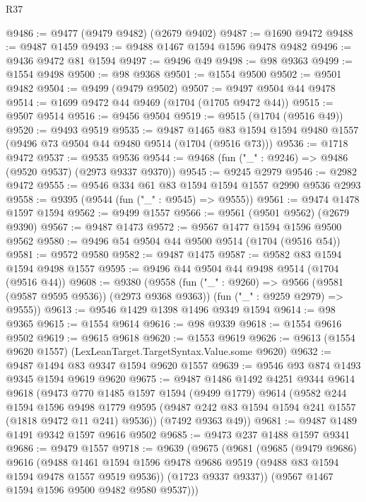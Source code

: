 \begin{lexlean}{R37}
\begin{coremodule}
@9486 := @9477 (@9479 @9482) (@2679 @9402)
@9487 := @1690 @9472
@9488 := @9487 @1459
@9493 := @9488 @1467 @1594 @1596 @9478 @9482
@9496 := @9436 @9472 @81 @1594
@9497 := @9496 @49
@9498 := @98 @9363
@9499 := @1554 @9498
@9500 := @98 @9368
@9501 := @1554 @9500
@9502 := @9501 @9482
@9504 := @9499 (@9479 @9502)
@9507 := @9497 @9504 @44 @9478
@9514 := @1699 @9472 @44 @9469 (@1704 (@1705 @9472 @44))
@9515 := @9507 @9514
@9516 := @9456 @9504
@9519 := @9515 (@1704 (@9516 @49))
@9520 := @9493 @9519
@9535 := @9487
    @1465
    @83
    @1594
    @1594
    @9480
    @1557
    (@9496 @73 @9504 @44 @9480 @9514 (@1704 (@9516 @73)))
@9536 := @1718 @9472
@9537 := @9535 @9536
@9544 := @9468 (fun ("_" : @9246) => @9486 (@9520 @9537) (@2973 @9337 @9370))
@9545 := @9245 @2979
@9546 := @2982 @9472
@9555 := @9546 @334 @61 @83 @1594 @1594 @1557 @2990 @9536 @2993
@9558 := @9395 (@9544 (fun ("_" : @9545) => @9555))
@9561 := @9474 @1478 @1597 @1594
@9562 := @9499 @1557
@9566 := @9561 (@9501 @9562) (@2679 @9390)
@9567 := @9487 @1473
@9572 := @9567 @1477 @1594 @1596 @9500 @9562
@9580 := @9496 @54 @9504 @44 @9500 @9514 (@1704 (@9516 @54))
@9581 := @9572 @9580
@9582 := @9487 @1475
@9587 := @9582 @83 @1594 @1594 @9498 @1557
@9595 := @9496 @44 @9504 @44 @9498 @9514 (@1704 (@9516 @44))
@9608 := @9380
    (@9558
      (fun ("_" : @9260) => @9566 (@9581 (@9587 @9595 @9536)) (@2973 @9368 @9363))
      (fun ("_" : @9259 @2979) => @9555))
@9613 := @9546 @1429 @1398 @1496 @9349 @1594
@9614 := @98 @9365
@9615 := @1554 @9614
@9616 := @98 @9339
@9618 := @1554 @9616 @9502
@9619 := @9615 @9618
@9620 := @1553 @9619
@9626 := @9613 (@1554 @9620 @1557) (LexLeanTarget.TargetSyntax.Value.some @9620)
@9632 := @9487 @1494 @83 @9347 @1594 @9620 @1557
@9639 := @9546 @93 @874 @1493 @9345 @1594 @9619 @9620
@9675 := @9487
    @1486
    @1492
    @4251
    @9344
    @9614
    @9618
    (@9473
      @770
      @1485
      @1597
      @1594
      (@9499 @1779)
      @9614
      (@9582
        @244
        @1594
        @1596
        @9498
        @1779
        @9595
        (@9487 @242 @83 @1594 @1594 @241 @1557 (@1818 @9472 @11 @241) @9536))
      (@7492 @9363 @49))
@9681 := @9487 @1489 @1491 @9342 @1597 @9616 @9502
@9685 := @9473 @237 @1488 @1597 @9341
@9686 := @9479 @1557
@9718 := @9639
    (@9675
      (@9681
        (@9685
          (@9479 @9686)
          @9616
          (@9488
            @1461
            @1594
            @1596
            @9478
            @9686
            @9519
            (@9488 @83 @1594 @1594 @9478 @1557 @9519 @9536))
          (@1723 @9337 @9337))
        (@9567 @1467 @1594 @1596 @9500 @9482 @9580 @9537)))

\end{coremodule}
\end{lexlean}
